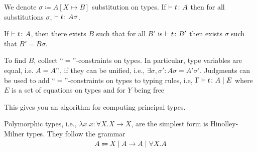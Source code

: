 \begin{remark}
    We denote $\sigma\coloneqq A[X \mapsto B]$ substitution on types.
    If $\proofs  t\colon A$ then for all substitutions $\sigma$, $\proofs  t \colon  A\sigma$.
\end{remark}
   

\begin{theorem}
\label{cl14:thrm:principal}
	If $\proofs  t\colon A$, then there exists $B$ such that for all $B'$ is $\proofs  t \colon  B'$ then exists $\sigma$ such that $B' = B\sigma$.
\end{theorem}






\begin{remark}
    To find $B$, collect ``$=$''-constraints on types. In particular, type variables are equal, i.e. $A = A"$, if they can be unified, i.e., $\exists \sigma, \sigma'\colon  A\sigma = A'\sigma'$.
    Judgments can be used to add ``$=$''-constraints on types to typing rules, i.e, $\Gamma \proofs  t\colon A \; |\;  E $ where $E$ is a set of equations on types and for $Y$ being free
    \begin{prooftree}
    \end{prooftree}
    
This gives you an algorithm for computing principal types.
\end{remark}


\begin{definition}
    Polymorphic types, i.e., $\lambda x.x \colon  \forall X.X\to X$, are the simplest form is Hinolley-Milner types. 
    They follow the grammar
    \begin{align*}
        A \Coloneqq X \; |\; A \to A \; |\; \forall X.A
    \end{align*}
\end{definition}




